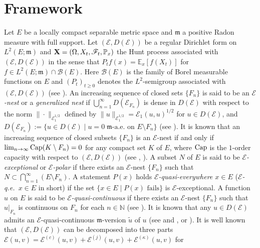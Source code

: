 \documentclass[12pt,a4paper]{article}
\newcommand{\m}{\mathfrak{m} }
\newcommand{\1}{{\bf 1}}
\begin{document}
\section{Framework}\label{sec:Frame}
Let $E$ be a locally compact separable metric space and ${\m}$ a positive Radon measure with full support. 
Let $(\mathscr{E},D(\mathscr{E}))$ 
be a regular Dirichlet form on $L^2(E;{\m})$ 
and ${\bf X}=(\Omega, X_t,\mathscr{F}_t, \mathbb{P}_x)$ the Hunt process 
associated with $(\mathscr{E},D(\mathscr{E}))$ in the sense that 
$P_tf(x)=\mathbb{E}_x[f(X_t)]$ for $f\in L^2(E;{\m})\cap \mathscr{B}(E)$. Here 
$\mathscr{B}(E)$ is the family of Borel measurable functions on $E$ and  
$(P_t)_{t\geq0}$ denotes the $L^2$-semigroup associated with $(\mathscr{E},D(\mathscr{E}))$ (see \cite[\S 7.2]{FOT}). 
An increasing sequence of closed sets 
$\{F_n\}$ is said to be an {\it $\mathscr{E}$-nest} or a 
{\it generalized nest} if $\bigcup_{n=1}^{\infty}D(\mathscr{E}_{F_n})$ is dense in $D(\mathscr{E})$ with respect to the norm $\|\cdot\|_{\mathscr{E}_1^{1/2}}$ defined by $\|u\|_{\mathscr{E}_1^{1/2}}=\mathscr{E}_1(u,u)^{1/2}$ for $u\in D(\mathscr{E})$, and $ D(\mathscr{E}_{F_n}):=\{u\in D(\mathscr{E})\mid u=0\;{\m}\text{-a.e.~on }E\setminus F_n\}$ (see \cite[Chapter III, Definition~2.1(i)]{MR}). 
It is known that an increasing sequence of closed subsets $\{F_n\}$ is an 
$\mathscr{E}$-nest if and only if $\lim_{n\to\infty}{\rm Cap}(K\setminus F_n)=0$ for any compact set $K$ of $E$, where ${\rm Cap}$ is the $1$-order 
capacity with respect to $(\mathscr{E},D(\mathscr{E}))$ (see \cite[Chapter IV, Lemma~4.5(i)$\Leftrightarrow$(iii)]{MR}, 
\cite[\S 2.1 and (2.2.17)]{FOT}).
A subset $N$ of $E$ is said to be {\it $\mathscr{E}$-exceptional} or 
{\it $\mathscr{E}$-polar} if there exists an $\mathscr{E}$-nest $\{F_n\}$ such that $N\subset \bigcap_{n=1}^{\infty}(E\setminus F_n)$. 
A statement $P(x)$ holds {\it $\mathscr{E}$-quasi-everywhere $x\in E$} ({\it $\mathscr{E}$-q.e.~$x\in E$} in short) if the set $\{x\in E\mid P(x)\text{ fails}\}$ is $\mathscr{E}$-exceptional.  
A function $u$ on $E$ is said to be {\it $\mathscr{E}$-quasi-continuous} if there
exists an $\mathscr{E}$-nest $\{F_n\}$ such that $u|_{F_n}$ is continuous on $F_n$ for each $n\in\mathbb{N}$ (see \cite[Chapter III, Definition~2.1(ii)]{MR}). It is known that any $u\in D(\mathscr{E})$ admits an $\mathscr{E}$-quasi-continuous ${\m}$-version $\tilde{u}$ of $u$ (see \cite[Theorem~2.1.3]{FOT} and \cite[Chapter IV, Lemma~4.5(i)$\Leftrightarrow$(iii)]{MR}, or 
\cite[Chapter IV, Proposition~3.3(ii) and \S4 a)]{MR}). 
It is well known that $(\mathscr{E},D(\mathscr{E}))$ can be decomposed into three parts $\mathscr{E}(u,v)=\mathscr{E}^{(c)}(u,v)+\mathscr{E}^{(j)}(u,v)+\mathscr{E}^{(\kappa)}(u,v)$ for 
\end{document}
